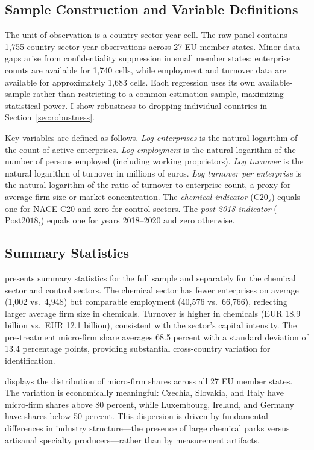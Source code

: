 \documentclass[12pt]{article}
\begin{document}
\subsection{Sample Construction and Variable Definitions}

The unit of observation is a country-sector-year cell. The raw panel contains 1,755 country-sector-year observations across 27 EU member states. Minor data gaps arise from confidentiality suppression in small member states: enterprise counts are available for 1,740 cells, while employment and turnover data are available for approximately 1,683 cells. Each regression uses its own available-sample rather than restricting to a common estimation sample, maximizing statistical power. I show robustness to dropping individual countries in Section~\ref{sec:robustness}.

Key variables are defined as follows. \textit{Log enterprises} is the natural logarithm of the count of active enterprises. \textit{Log employment} is the natural logarithm of the number of persons employed (including working proprietors). \textit{Log turnover} is the natural logarithm of turnover in millions of euros. \textit{Log turnover per enterprise} is the natural logarithm of the ratio of turnover to enterprise count, a proxy for average firm size or market concentration. The \textit{chemical indicator} ($\text{C20}_s$) equals one for NACE C20 and zero for control sectors. The \textit{post-2018 indicator} ($\text{Post2018}_t$) equals one for years 2018--2020 and zero otherwise.

\subsection{Summary Statistics}

 presents summary statistics for the full sample and separately for the chemical sector and control sectors. The chemical sector has fewer enterprises on average (1,002 vs.\ 4,948) but comparable employment (40,576 vs.\ 66,766), reflecting larger average firm size in chemicals. Turnover is higher in chemicals (EUR 18.9 billion vs.\ EUR 12.1 billion), consistent with the sector's capital intensity. The pre-treatment micro-firm share averages 68.5 percent with a standard deviation of 13.4 percentage points, providing substantial cross-country variation for identification.



 displays the distribution of micro-firm shares across all 27 EU member states. The variation is economically meaningful: Czechia, Slovakia, and Italy have micro-firm shares above 80 percent, while Luxembourg, Ireland, and Germany have shares below 50 percent. This dispersion is driven by fundamental differences in industry structure---the presence of large chemical parks versus artisanal specialty producers---rather than by measurement artifacts.
\end{document}
